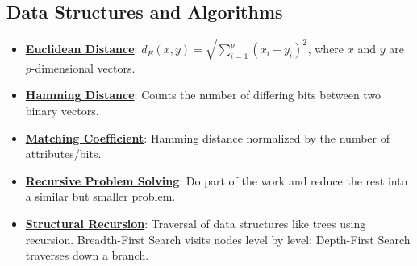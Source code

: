 \documentclass{article}%
\begin{document}
\subsection{Data Structures and Algorithms}%
\label{subsec:DataStructuresandAlgorithms}%
\begin{itemize}[leftmargin=*]%
\item \href{https://purdue.brightspace.com/d2l/common/assets/pdfjs-d2l-dist/1.0.14-legacy/web/viewer.html?file=\%2Fcontent\%2Fenforced\%2F1095467-wl.202510.CS.24300.001\%2F12L2-distance-clusters.pdf\%3Fou\%3D1095467\&lang=en-us\&container=d2l-fileviewer-rendered-pdf\&fullscreen=d2l-fileviewer-rendered-pdf-dialog\&height=667#page=17}{\textbf{Euclidean Distance}}: $d_E(x, y) = \sqrt{\sum_{i=1}^{p} (x_i - y_i)^2}$, where $x$ and $y$ are $p$-dimensional vectors.%
\item \href{https://purdue.brightspace.com/d2l/common/assets/pdfjs-d2l-dist/1.0.14-legacy/web/viewer.html?file=\%2Fcontent\%2Fenforced\%2F1095467-wl.202510.CS.24300.001\%2F12L2-distance-clusters.pdf\%3Fou\%3D1095467\&lang=en-us\&container=d2l-fileviewer-rendered-pdf\&fullscreen=d2l-fileviewer-rendered-pdf-dialog\&height=667#page=19}{\textbf{Hamming Distance}}: Counts the number of differing bits between two binary vectors.%
\item \href{https://purdue.brightspace.com/d2l/common/assets/pdfjs-d2l-dist/1.0.14-legacy/web/viewer.html?file=\%2Fcontent\%2Fenforced\%2F1095467-wl.202510.CS.24300.001\%2F12L2-distance-clusters.pdf\%3Fou\%3D1095467\&lang=en-us\&container=d2l-fileviewer-rendered-pdf\&fullscreen=d2l-fileviewer-rendered-pdf-dialog\&height=667#page=19}{\textbf{Matching Coefficient}}: Hamming distance normalized by the number of attributes/bits.%
\item \href{https://purdue.brightspace.com/d2l/common/assets/pdfjs-d2l-dist/1.0.14-legacy/web/viewer.html?file=\%2Fcontent\%2Fenforced\%2F1095467-wl.202510.CS.24300.001\%2F14L1-DepthFS.pdf\%3Fou\%3D1095467\&lang=en-us\&container=d2l-fileviewer-rendered-pdf\&fullscreen=d2l-fileviewer-rendered-pdf-dialog\&height=667#page=4}{\textbf{Recursive Problem Solving}}: Do part of the work and reduce the rest into a similar but smaller problem.%
\item \href{https://purdue.brightspace.com/d2l/common/assets/pdfjs-d2l-dist/1.0.14-legacy/web/viewer.html?file=\%2Fcontent\%2Fenforced\%2F1095467-wl.202510.CS.24300.001\%2F14L1-DepthFS.pdf\%3Fou\%3D1095467\&lang=en-us\&container=d2l-fileviewer-rendered-pdf\&fullscreen=d2l-fileviewer-rendered-pdf-dialog\&height=667#page=8}{\textbf{Structural Recursion}}: Traversal of data structures like trees using recursion. Breadth-First Search visits nodes level by level; Depth-First Search traverses down a branch.%
\end{itemize}
\end{document}
